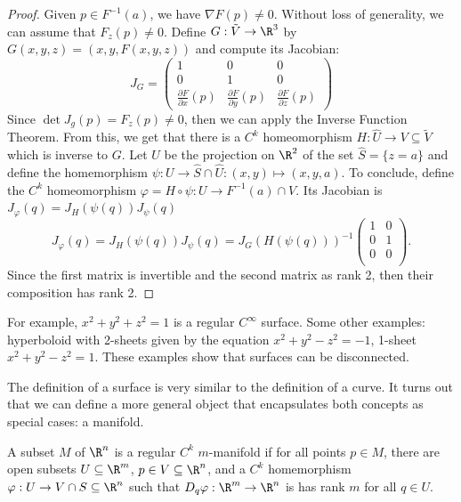 \begin{proof}
    Given $p \in F^{-1}(a)$, we have $\nabla F(p) \neq 0$. Without loss of generality, we can assume that $F_z(p) \neq 0$. Define $G : \tilde{V} \to \R^3$ by $G(x,y,z) = (x,y,F(x,y,z))$ and compute its Jacobian:
    $$J_G = \begin{pmatrix}
        1 & 0 & 0 \\
        0 & 1 & 0 \\
        \frac{\partial F}{\partial x}(p) & \frac{\partial F}{\partial y}(p) & \frac{\partial F}{\partial z}(p)
    \end{pmatrix}$$
    Since $\det J_g(p) = F_z(p) \neq 0$, then we can apply the Inverse Function Theorem. From this, we get that there is a $C^k$ homeomorphism $H : \hat{U} \to V \subseteq \tilde{V}$ which is inverse to $G$. Let $U$ be the projection on $\R^2$ of the set $\hat{S} = \{z = a\}$ and define the homemorphism $\psi : U \to \hat{S} \cap \hat{U} : (x,y) \mapsto (x,y,a)$. To conclude, define the $C^k$ homeomorphism $\varphi = H \circ \psi : U \to F^{-1}(a) \cap V$. Its Jacobian is $J_{\varphi}(q) = J_H(\psi(q))J_{\psi}(q)$
    $$J_{\varphi}(q) = J_H(\psi(q))J_{\psi}(q) =J_G(H(\psi(q)))^{-1}\begin{pmatrix}
        1 & 0 \\
        0 & 1 \\
        0 & 0 \\
    \end{pmatrix}.$$
    Since the first matrix is invertible and the second matrix as rank 2, then their composition has rank 2.
\end{proof}

For example, $x^2 + y^2 + z^2 = 1$ is a regular $C^{\infty}$ surface. Some other examples: hyperboloid with 2-sheets given by the equation $x^2 + y^2 - z^2 = -1$, 1-sheet $x^2 + y^2 - z^2 = 1$. These examples show that surfaces can be disconnected.

The definition of a surface is very similar to the definition of a curve. It turns out that we can define a more general object that encapsulates both concepts as special cases: a manifold.

\begin{definition}[Manifold]
    A subset $M$ of $\R^n$ is a regular $C^k$ $m$-manifold if for all points $p \in M$, there are open subsets $U \subseteq \R^m$, $p \in V \subseteq \R^n$, and a $C^k$ homemorphism $\varphi : U \to V \cap S \subseteq \R^n$ such that $D_q\varphi : \R^m \to \R^n$ is has rank $m$ for all $q \in U$.
\end{definition}

